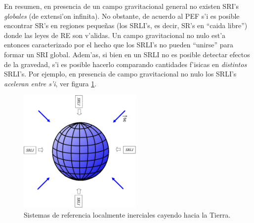 En resumen, en presencia de un campo gravitacional general no existen SRI's \emph{globales} (de extensi'on infinita). No obstante, de acuerdo al PEF s'i es posible encontrar SR's en regiones peque\~nas (los SRLI's, es decir, SR's en ``caida libre'') donde las leyes de RE son v'alidas. Un campo gravitacional no nulo est'a entonces caracterizado por el hecho que los SRLI's no pueden ``unirse'' para formar un SRI global. Adem'as, si bien en un SRLI no es posible detectar efectos de la gravedad, s'i es posible hacerlo comparando cantidades f'isicas en \textit{distintos} SRLI's. Por ejemplo, en presencia de campo gravitacional no nulo los SRLI's \textit{aceleran entre s'i}, ver figura \ref{fig:SRLI}.
\begin{figure}[H]
\centering\includegraphics[width=6cm]{fig/fig-SRLI.pdf}
\caption{Sistemas de referencia localmente inerciales cayendo hacia la Tierra.}
\label{fig:SRLI}
\end{figure}

